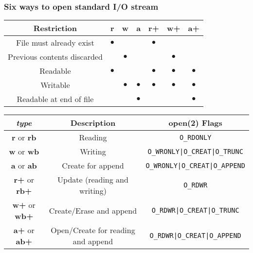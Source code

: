 \documentclass[10pt]{article}
\begin{document}
\begin{multicols}{2}
\begin{minipage}{\columnwidth}
\begin{flushright}
            \subsubsection*{Six ways to open standard I/O stream}
            \begin{tabular}{|c|c|c|c|c|c|c|}
                \hline
                Restriction                 & r         & w         & a         & r+        & w+        & a+        \\
                \hline
                \hline
                File must already exist     & $\bullet$ &           &           & $\bullet$ &           &           \\
                Previous contents discarded &           & $\bullet$ &           &           & $\bullet$ &           \\
                \hline
                Readable                    & $\bullet$ &           &           & $\bullet$ & $\bullet$ & $\bullet$ \\
                Writable                    &           & $\bullet$ & $\bullet$ & $\bullet$ & $\bullet$ & $\bullet$ \\
                Readable at end of file     &           &           & $\bullet$ &           &           & $\bullet$ \\
                \hline
            \end{tabular}
            \begin{tabular}{|c|c|c|}
                \hline
                \textit{type}               & Description                        & open(2) Flags                         \\
                \hline
                \hline
                \textbf{r} or \textbf{rb}   & Reading                            & \lstinline|O_RDONLY|                  \\
                \textbf{w} or \textbf{wb}   & Writing                            & \lstinline!O_WRONLY|O_CREAT|O_TRUNC!  \\
                \textbf{a} or \textbf{ab}   & Create for append                  & \lstinline!O_WRONLY|O_CREAT|O_APPEND! \\
                \textbf{r+} or \textbf{rb+} & Update (reading and writing)       & \lstinline!O_RDWR!                    \\
                \textbf{w+} or \textbf{wb+} & Create/Erase and append            & \lstinline!O_RDWR|O_CREAT|O_TRUNC!    \\
                \textbf{a+} or \textbf{ab+} & Open/Create for reading and append & \lstinline!O_RDWR|O_CREAT|O_APPEND!   \\
                \hline
            \end{tabular}

\end{flushright}
\end{minipage}
\end{multicols}
\end{document}
